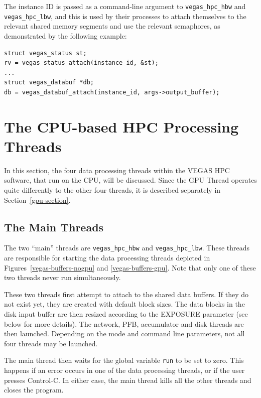 \documentclass[11pt]{article} %
\begin{document}
The instance ID is passed as a command-line argument to {\tt vegas\_hpc\_hbw} and {\tt vegas\_hpc\_lbw},
and this is used by their processes to attach themselves to the relevant shared memory segments and use
the relevant semaphores, as demonstrated by the following example:

\begin{verbatim}
struct vegas_status st;
rv = vegas_status_attach(instance_id, &st);
...
struct vegas_databuf *db;
db = vegas_databuf_attach(instance_id, args->output_buffer);
\end{verbatim}



\clearpage
\section{The CPU-based HPC Processing Threads}

In this section, the four data processing threads within the VEGAS HPC software, that run on the CPU, will be discussed. Since the GPU Thread operates quite differently to the other four threads, it is described separately in Section~\ref{gpu-section}.

\subsection{The Main Threads}
The two ``main'' threads are \texttt{vegas\_hpc\_hbw} and \texttt{vegas\_hpc\_lbw}. These threads are responsible for starting the data processing threads depicted in Figures~\ref{vegas-buffers-nogpu} and \ref{vegas-buffers-gpu}. Note that only one of these two threads never run simultaneously.

These two threads first attempt to attach to the shared data buffers. If they do not exist yet, they are created with default block sizes. The data blocks in the disk input buffer are then resized according to the EXPOSURE parameter (see below for more details). The network, PFB, accumulator and disk threads are then launched. Depending on the mode and command line parameters, not all four threads may be launched.

The main thread then waits for the global variable \texttt{run} to be set to zero. This happens if an error occurs in one of the data processing threads, or if the user presses Control-C. In either case, the main thread kills all the other threads and closes the program.
\end{document}
